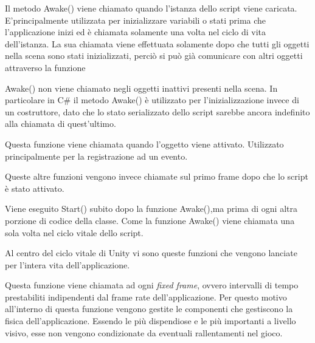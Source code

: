 \begin{flushleft}
\begin{algorithmic}
\end{algorithmic}
Il metodo Awake() viene chiamato quando l'istanza dello script viene caricata.
E'principalmente utilizzata per inizializzare variabili o stati prima che l'applicazione inizi ed è chiamata solamente una volta nel ciclo di vita dell'istanza. La sua chiamata viene effettuata solamente dopo che tutti gli oggetti nella scena sono stati inizializzati, perciò si può già comunicare con altri oggetti attraverso la funzione \begin{algorithmic} \end{algorithmic}
Awake() non viene chiamato negli oggetti inattivi presenti nella scena.
In particolare in C\# il metodo Awake() è utilizzato per l'inizializzazione invece di un costruttore, dato che lo stato serializzato dello script sarebbe ancora indefinito alla chiamata di quest'ultimo.
	
\end{flushleft}

\newpage

\begin{flushleft}
	\begin{algorithmic}
	\end{algorithmic}
Questa funzione viene chiamata quando l'oggetto viene attivato. Utilizzato principalmente per la registrazione ad un evento.
	
\end{flushleft}


Queste altre funzioni vengono invece chiamate sul primo frame dopo che lo script è stato attivato.
\begin{flushleft}
	\begin{algorithmic}
		\STATE{\textbf{Start()}}
	\end{algorithmic}
Viene eseguito Start() subito dopo la funzione Awake(),ma prima di ogni altra porzione di codice della classe. Come la funzione Awake() viene chiamata una sola volta nel ciclo vitale dello script.
\end{flushleft}


Al centro del ciclo vitale di Unity vi sono queste funzioni che vengono lanciate per l'intera vita dell'applicazione.

\begin{flushleft}
	\begin{algorithmic}
		\STATE{\textbf{FixedUpdate()}}
	\end{algorithmic}
	Questa funzione viene chiamata ad ogni \textit{fixed frame}, ovvero intervalli di tempo prestabiliti indipendenti dal frame rate dell'applicazione. Per questo motivo all'interno di questa funzione vengono gestite le componenti che gestiscono la fisica dell'applicazione. Essendo le più dispendiose e le più importanti a livello visivo, esse non vengono condizionate da eventuali rallentamenti nel gioco.
\end{flushleft}

